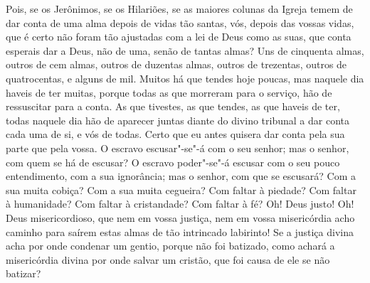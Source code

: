Pois, se os Jerônimos, se os Hilariões, se as maiores colunas da Igreja
temem de dar conta de uma alma depois de vidas tão santas, vós, depois
das vossas vidas, que é certo não foram tão ajustadas com a lei de Deus
como as suas, que conta esperais dar a Deus, não de uma, senão de tantas
almas? Uns de cinquenta almas, outros de cem almas, outros de duzentas
almas, outros de trezentas, outros de quatrocentas, e alguns de mil.
Muitos há que tendes hoje poucas, mas naquele dia haveis de ter muitas,
porque todas as que morreram para o serviço, hão de ressuscitar para a
conta. As que tivestes, as que tendes, as que haveis de ter, todas
naquele dia hão de aparecer juntas diante do divino tribunal a dar conta
cada uma de si, e vós de todas. Certo que eu antes quisera dar conta
pela sua parte que pela vossa. O escravo escusar"-se"-á com o seu senhor;
mas o senhor, com quem se há de escusar? O escravo poder"-se"-á escusar
com o seu pouco entendimento, com a sua ignorância; mas o senhor, com
que se escusará? Com a sua muita cobiça? Com a sua muita cegueira? Com
faltar à piedade? Com faltar à humanidade? Com faltar à cristandade? Com
faltar à fé? Oh! Deus justo! Oh! Deus misericordioso, que nem em vossa
justiça, nem em vossa misericórdia acho caminho para saírem estas almas
de tão intrincado labirinto! Se a justiça divina acha por onde condenar
um gentio, porque não foi batizado, como achará a misericórdia divina
por onde salvar um cristão, que foi causa de ele se não batizar?

